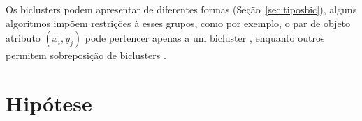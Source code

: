 \documentclass[normaltoc, espacoumemeio, pnumromarab,ruledheader]{abnt}
\begin{document}


Os biclusters podem apresentar de diferentes formas (Seção~\ref{sec:tiposbic}), alguns algoritmos impõem restrições à esses grupos, como por exemplo, o par de objeto atributo $(x_i,y_j)$ pode pertencer apenas a um bicluster \cite{Kluger2003}, enquanto outros permitem sobreposição de biclusters \cite{Cheng2000}.



\section{Hipótese}



\end{document}
